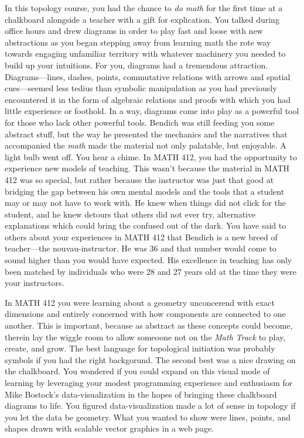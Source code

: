 \documentclass[../main.tex]{subfiles}
\begin{document}
In this topology course, you had the chance to \textit{do math} for the first time at a chalkboard alongside a teacher with a gift for explication. You talked during office hours and drew diagrams in order to play fast and loose with new abstractions as you began stepping away from learning math the rote way towards engaging unfamiliar territory with whatever machinery you needed to build up your intuitions. For you, diagrams had a tremendous attraction. Diagrams---lines, dashes, points, commutative relations with arrows and spatial cues---seemed less tedius than symbolic manipulation as you had previously encountered it in the form of algebraic relations and proofs with which you had little experience or foothold. In a way, diagrams come into play as a powerful tool for those who lack other powerful tools. Bendich was still feeding you some abstract stuff, but the way he presented the mechanics and the narratives that accompanied the \textit{math} made the material not only palatable, but enjoyable. A light bulb went off. You hear a chime. In MATH 412, you had the opportunity to experience new models of teaching. This wasn't because the material in MATH 412 was so special, but rather because the instructor was just that good at bridging the gap between his own mental models and the tools that a student may or may not have to work with. He knew when things did not click for the student, and he knew detours that others did not ever try, alternative explanations which could bring the confused out of the dark. You have said to others about your experiences in MATH 412 that Bendich is a new breed of teacher---the nouvau-instructor. He was 36 and that number would come to sound higher than you would have expected. His excellence in teaching has only been matched by individuals who were 28 and 27 years old at the time they were your instructors.

In MATH 412 you were learning about a geometry unconcerend with exact dimensions and entirely concerned with how components are connected to one another. This is important, because as abstract as these concepts could become, therein lay the wiggle room to allow someoone not on the \textit{Math Track} to play, create, and grow. The best language for topological initiation was probably symbols if you had the right backgorund. The second best was a nice drawing on the chalkboard. You wondered if you could expand on this visual mode of learning by leveraging your modest programming experience and enthusiasm for Mike Bostock's data-visualization in the hopes of bringing these chalkboard diagrams to life. You figured data-visualization made a lot of sense in topology if you let the data be geometry. What you wanted to show were lines, points, and shapes drawn with scalable vector graphics in a web page.
\end{document}
